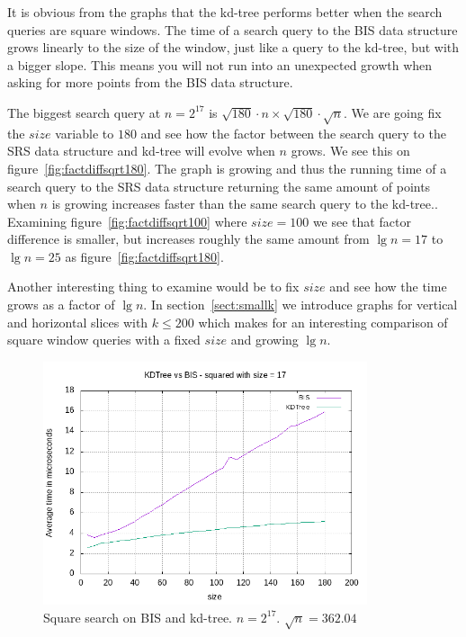 It is obvious from the graphs that the kd-tree performs better when the search queries are square windows. The time of a search query to the BIS data structure grows linearly to the size of the window, just like a query to the kd-tree, but with a bigger slope. This means you will not run into an unexpected growth when asking for more points from the BIS data structure.

The biggest search query at $n = 2^{17}$ is $\sqrt{180}\cdot{n} \times \sqrt{180}\cdot\sqrt{n}$. We are going fix the $size$ variable to $180$ and see how the factor between the search query to the SRS data structure and kd-tree will evolve when $n$ grows. We see this on figure~\ref{fig:factdiffsqrt180}. The graph is growing and thus the running time of a search query to the SRS data structure returning the same amount of points when $n$ is growing increases faster than the same search query to the kd-tree.. Examining figure~\ref{fig:factdiffsqrt100} where $size = 100$ we see that factor difference is smaller, but increases roughly the same amount from $\lg n = 17$ to $\lg n = 25$ as figure~\ref{fig:factdiffsqrt180}. 

Another interesting thing to examine would be to fix $size$ and see how the time grows as a factor of $\lg n$. In section~\ref{sect:smallk} we introduce graphs for vertical and horizontal slices with $k \leq 200$ which makes for an interesting comparison of square window queries with a fixed $size$ and growing $\lg n$. 


\begin{figure}[h]
    \centering
    \includegraphics[width = 0.85\textwidth]{pictures/analysis/sqrt_17.png}
    \caption{Square search on BIS and kd-tree. $n=2^{17}$. $\sqrt{n} = 362.04$}\label{fig:sqrt_17}
\end{figure}


